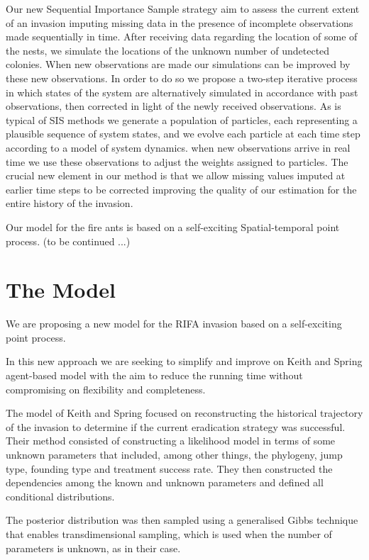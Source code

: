 \documentclass[11pt,a4paper]{article}
\begin{document}
{Our new Sequential Importance Sample strategy aim to assess the current extent of an invasion imputing missing data in the presence of incomplete observations made sequentially in time. After receiving data regarding the location of some of the nests, we simulate the locations of the unknown number of undetected colonies. When new observations are made our simulations can be improved by these new observations. In order to do so we propose a two-step iterative process in which states of the system are alternatively simulated in accordance with past observations, then corrected in light of the newly received observations. As is typical of SIS methods we generate a population of particles, each representing a plausible sequence of system states, and we evolve each particle at each time step according to a model of system dynamics. when new observations arrive in real time we use these observations to adjust the weights assigned to particles. The crucial new element in our method is that we allow missing values imputed at earlier time steps to be corrected improving the quality of our estimation for the entire history of the invasion.

Our model for the fire ants is based on a self-exciting Spatial-temporal point process. (to be continued ...)}


\section{The Model}\label{section:model}

We are proposing a new model for the RIFA invasion based on a self-exciting point process.

In this new approach we are seeking to simplify and improve on Keith and Spring agent-based model \cite{Keith} with the aim to reduce the running time without compromising on flexibility and completeness.

The model of Keith and Spring focused on reconstructing the historical trajectory of the invasion to determine if the current eradication strategy was successful. Their method consisted of constructing a likelihood model in terms of some unknown parameters that included, among other things, the phylogeny, jump type, founding type and treatment success rate. They then constructed the dependencies among the known and unknown parameters and defined all conditional distributions.

The posterior distribution was then sampled using a generalised Gibbs technique that enables transdimensional sampling, which is used when the number of parameters is unknown, as in their case.
\end{document}

